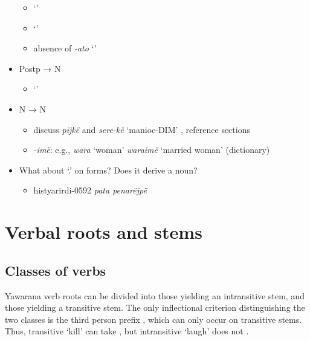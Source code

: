 \documentclass{memoir}
\begin{document}
\begin{itemize}
  \begin{itemize}
  \tightlist
  \item
     `'
  \item
     `'
  \item
    absence of \emph{-ato} `'
  \end{itemize}
\item
  Postp → N

  \begin{itemize}
  \tightlist
  \item
     `'
  \end{itemize}
\item
  N → N

  \begin{itemize}
  \tightlist
  \item
    discuss \emph{pïjkë} and \emph{sere-kë} `manioc-DIM' , reference
    sections
  \item
    \emph{-imë}: e.g., \emph{wara} `woman' \emph{waraimë} `married
    woman' (dictionary)
  \end{itemize}
\item
  What about  `.' on  forms? Does it
  derive a noun?

  \begin{itemize}
  \tightlist
  \item
    histyarirdi-0592 \emph{pata penarëjpë}
  \end{itemize}
\end{itemize}

\chapter{\texorpdfstring{Verbal roots and stems
\label{verbderiv}}{Verbal roots and stems }}

\section{Classes of verbs}

Yawarana verb roots can be divided into those yielding an intransitive
stem, and those yielding a transitive stem. The only inflectional
criterion distinguishing the two classes is the third person prefix
, which can only occur on transitive stems. Thus, transitive
 `kill' can take  , but
intransitive  `laugh' does not .
\end{document}
